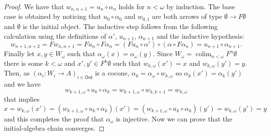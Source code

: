 \documentclass[letterpaper, 11pt, oneside]{memoir}
\theoremstyle{myteo}
\numberwithin{equation}{section}
\DeclareMathOperator*\colim{colim}
\newcommand{\Ord}{\textsf{Ord}}
\begin{document}
\begin{proof}
  We have that \(w_{n, n+1} = u_n \circ \alpha_n\) holds for \(n < \omega\) by induction.
  The base case is obtained by noticing that \(u_0 \circ \alpha_0\) and \(w_{0,1}\) are both arrows of type \(\emptyset \to F\emptyset\) and \(\emptyset\) is the initial object.
  The inductive step follows from the following calculation using the definitions of \(\alpha'\), \(u_{n+1}\), \(\alpha_{n+1}\) and the inductive hypothesis:
  \begin{equation*}
    w_{n+1, n+2} = Fw_{n, n+1} = Fu_n \circ F\alpha_n = (Fu_n \circ \alpha') \circ (\alpha \circ F\alpha_n) = u_{n+1} \circ \alpha_{n+1}.
  \end{equation*}
  Finally let \(x, y \in W_\omega\) such that \(\alpha_\omega(x) = \alpha_\omega(y)\).
  Since \(W_\omega = \colim_{n < \omega}F^n\emptyset\) there is some \(k < \omega\) and \(x', y' \in F^k\emptyset\) such that \(w_{k, \omega}(x') = x\) and \(w_{k, \omega}(y') = y\).
  Then, as \((\alpha_i: W_i \to A)_{i \in \Ord}\) is a cocone, \(\alpha_k = \alpha_\omega \circ w_{k, \omega}\) so \(\alpha_k(x') = \alpha_k(y')\) and we have
  \begin{equation*}
    w_{k+1, \omega} \circ u_k \circ \alpha_k = w_{k+1, \omega} \circ w_{k, k+1} = w_{k, \omega}
  \end{equation*}
  that implies
  \begin{equation*}
    x = w_{k, \omega}(x') = (w_{k+1, \omega} \circ u_k \circ \alpha_k)(x') = (w_{k+1, \omega} \circ u_k \circ \alpha_k)(y') = w_{k, \omega}(y') = y
  \end{equation*}
  and this completes the proof that \(\alpha_\omega\) is injective.
  Now we can prove that the initial-algebra chain converges.


\end{proof}
\end{document}
